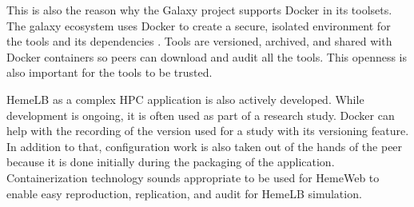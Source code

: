 This is also the reason why the Galaxy project supports Docker in its toolsets. The galaxy ecosystem uses Docker to create a secure, isolated environment for the tools and its dependencies \citep{moreews2015curated}. Tools are versioned, archived, and shared with Docker containers so peers can download and audit all the tools. This openness is also important for the tools to be trusted.

HemeLB as a complex HPC application is also actively developed. While development is ongoing, it is often used as part of a research study. Docker can help with the recording of the version used for a study with its versioning feature. In addition to that, configuration work is also taken out of the hands of the peer because it is done initially during the packaging of the application. Containerization technology sounds appropriate to be used for HemeWeb to enable easy reproduction, replication, and audit for HemeLB simulation.






%
%
%

